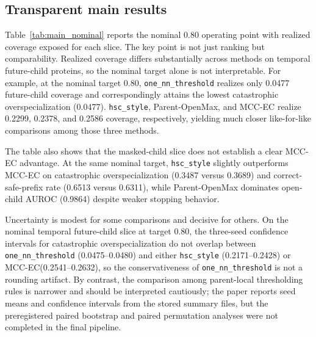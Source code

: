\documentclass{article}
\newcommand{\method}{MCC-EC\xspace}
\begin{document}
\subsection{Transparent main results}

Table~\ref{tab:main_nominal} reports the nominal 0.80 operating point with realized coverage exposed for each slice. The key point is not just ranking but comparability. Realized coverage differs substantially across methods on temporal future-child proteins, so the nominal target alone is not interpretable. For example, at the nominal target 0.80, \texttt{one\_nn\_threshold} realizes only 0.0477 future-child coverage and correspondingly attains the lowest catastrophic overspecialization (0.0477). \texttt{hsc\_style}, Parent-OpenMax, and \method realize 0.2299, 0.2378, and 0.2586 coverage, respectively, yielding much closer like-for-like comparisons among those three methods.

The table also shows that the masked-child slice does not establish a clear \method advantage. At the same nominal target, \texttt{hsc\_style} slightly outperforms \method on catastrophic overspecialization (0.3487 versus 0.3689) and correct-safe-prefix rate (0.6513 versus 0.6311), while Parent-OpenMax dominates open-child AUROC (0.9864) despite weaker stopping behavior.

Uncertainty is modest for some comparisons and decisive for others. On the nominal temporal future-child slice at target 0.80, the three-seed confidence intervals for catastrophic overspecialization do not overlap between \texttt{one\_nn\_threshold} (0.0475--0.0480) and either \texttt{hsc\_style} (0.2171--0.2428) or \method (0.2541--0.2632), so the conservativeness of \texttt{one\_nn\_threshold} is not a rounding artifact. By contrast, the comparison among parent-local thresholding rules is narrower and should be interpreted cautiously; the paper reports seed means and confidence intervals from the stored summary files, but the preregistered paired bootstrap and paired permutation analyses were not completed in the final pipeline.
\end{document}
